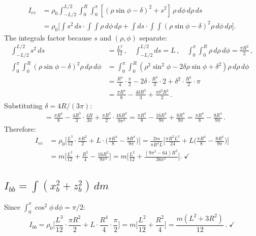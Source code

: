 \documentclass[11pt]{article}
\begin{document}
\begin{align}
I_{ee} &= \rho_0\int_{-L/2}^{L/2}\!\int_0^R\!\int_0^\pi
  [(\rho\sin\phi-\delta)^2+s^2]\,\rho\,d\phi\,d\rho\,ds \\
&= \rho_0\biggl[\int s^2\,ds\cdot\int\!\!\int\rho\,d\phi\,d\rho
  +\int ds\cdot\int\!\!\int(\rho\sin\phi-\delta)^2\rho\,d\phi\,d\rho\biggr].
\end{align}
The integrals factor because $s$ and $(\rho,\phi)$ separate:
\begin{align}
\int_{-L/2}^{L/2}s^2\,ds &= \frac{L^3}{12}\,,\quad
\int_{-L/2}^{L/2}ds = L\,,\quad
\int_0^\pi\!\int_0^R\rho\,d\rho\,d\phi = \frac{\pi R^2}{2}\,,\\
\int_0^\pi\!\int_0^R(\rho\sin\phi-\delta)^2\rho\,d\rho\,d\phi
&= \int_0^\pi\!\int_0^R(\rho^2\sin^2\!\phi-2\delta\rho\sin\phi+\delta^2)\rho\,d\rho\,d\phi \\
&= \frac{R^4}{4}\cdot\frac{\pi}{2}
  -2\delta\cdot\frac{R^3}{3}\cdot 2
  +\delta^2\cdot\frac{R^2}{2}\cdot\pi \\
&= \frac{\pi R^4}{8}-\frac{4\delta R^3}{3}+\frac{\pi\delta^2 R^2}{2}\,.
\end{align}
Substituting $\delta=4R/(3\pi)$:
\begin{align}
&= \frac{\pi R^4}{8}-\frac{4R^3}{3}\cdot\frac{4R}{3\pi}
  +\frac{\pi R^2}{2}\cdot\frac{16R^2}{9\pi^2}
= \frac{\pi R^4}{8}-\frac{16R^4}{9\pi}+\frac{8R^4}{9\pi}
= \frac{\pi R^4}{8}-\frac{8R^4}{9\pi}\,.
\end{align}
Therefore:
\begin{align}
I_{ee} &= \rho_0\biggl[\frac{L^3}{12}\cdot\frac{\pi R^2}{2}
  +L\cdot\bigl(\frac{\pi R^4}{8}-\frac{8R^4}{9\pi}\bigr)\biggr]
= \frac{2m}{\pi R^2 L}\biggl[\frac{\pi R^2 L^3}{24}
  +L\bigl(\frac{\pi R^4}{8}-\frac{8R^4}{9\pi}\bigr)\biggr] \\
&= m\biggl[\frac{L^2}{12}+\frac{R^2}{4}-\frac{16R^2}{9\pi^2}\biggr]
= m\biggl[\frac{L^2}{12}+\frac{(9\pi^2-64)R^2}{36\pi^2}\biggr].\;\checkmark
\end{align}

\subsection{$I_{bb}=\int(x_b^2+z_b^2)\,dm$}

Since $\int_0^\pi\cos^2\!\phi\,d\phi=\pi/2$:
\begin{equation}
I_{bb} = \rho_0\biggl[\frac{L^3}{12}\cdot\frac{\pi R^2}{2}
  +L\cdot\frac{R^4}{4}\cdot\frac{\pi}{2}\biggr]
= m\biggl[\frac{L^2}{12}+\frac{R^2}{4}\biggr]
= \frac{m(L^2+3R^2)}{12}\,.\;\checkmark
\end{equation}
\end{document}
